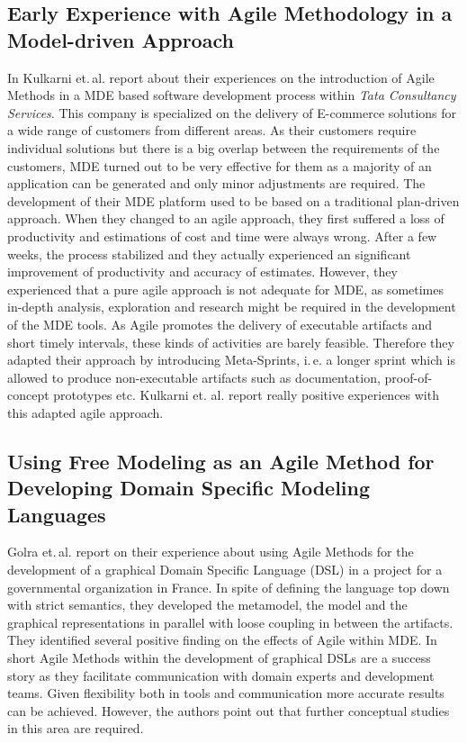 \documentclass[10pt, a4paper, twocolumn]{article}
\begin{document}
\subsection{Early Experience with Agile Methodology in a Model-driven Approach}

In \cite{11} Kulkarni et.\,al. report about their experiences on the introduction of Agile Methods in a MDE based software development process within \emph{Tata Consultancy Services}.
This company is specialized on the delivery of E-commerce solutions for a wide range of customers from different areas.
As their customers require individual solutions but there is a big overlap between the requirements of the customers, MDE turned out to be very effective for them as a majority of an application can be generated and only minor adjustments are required.
The development of their MDE platform used to be based on a traditional plan-driven approach. 
When they changed to an agile approach, they first suffered a loss of productivity and estimations of cost and time were always wrong. 
After a few weeks, the process stabilized and they actually experienced an significant improvement of productivity and accuracy of estimates.
However, they experienced that a pure agile approach is not adequate for MDE, as sometimes in-depth analysis, exploration and research might be required in the development of the MDE tools.
As Agile promotes the delivery of executable artifacts and short timely intervals, these kinds of activities are barely feasible.
Therefore they adapted their approach by introducing Meta-Sprints, i.\,e. a longer sprint which is allowed to produce non-executable artifacts such as documentation, proof-of-concept prototypes etc.
Kulkarni et. al. report really positive experiences with this adapted agile approach.

\subsection{Using Free Modeling as an Agile Method for Developing Domain Specific Modeling Languages}

Golra et.\,al. \cite{12} report on their experience about using Agile Methods for the development of a graphical Domain Specific Language (DSL) in a project for a governmental organization in France.
In spite of defining the language top down with strict semantics, they developed the metamodel, the model and the graphical representations in parallel with loose coupling in between the artifacts.
They identified several positive finding on the effects of Agile within MDE.
In short Agile Methods within the development of graphical DSLs are a success story as they facilitate communication with domain experts and development teams.
Given flexibility both in tools and communication more accurate results can be achieved.
However, the authors point out that further conceptual studies in this area are required.
\end{document}
